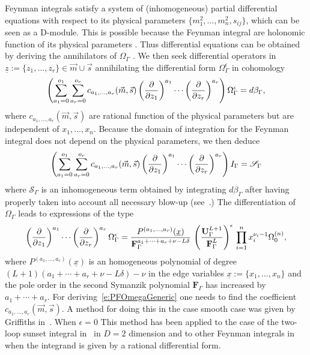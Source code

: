 \documentclass[a4paper,12pt]{article}
\newcommand\lNote[1]{
	\todo[backgroundcolor=red!20!white,fancyline,
	bordercolor=white]{ LDLC:  #1}}
\numberwithin{equation}{section}
\numberwithin{figure}{section}
\begin{document}
Feynman integrals satisfy a system of  (inhomogeneous) partial
differential equations with respect to its physical parameters
$ \{m_1^2,\dots,m_n^2,s_{ij}\}$, which can be seen as a D-module. This is possible
because the Feynman integral are holonomic function of its physical parameters \cite{Kashiwara:1977nf}.  Thus differential equations can be obtained by deriving the annihilators  of  $\Omega_\Gamma$ \lNote{$\epsilon$?}.
We then seek differential operators in $\underline
z:=\{z_1,\dots,z_r\} \in \vec m \cup \vec s$
annihilating the differential form $\Omega_\Gamma^\epsilon$ in cohomology
\begin{equation}\label{e:PFOmegaGeneric}
\left(  \sum_{a_1=0}^{o_1} \sum_{ a_r=0}^{o_r}  c_{a_1,\dots, a_r}(\vec m,\vec s) \left(\partial\over \partial z_1\right)^{a_1}\cdots\left(\partial
  \over\partial z_r\right)^{a_r}  \right)\Omega_\Gamma^\epsilon=d\beta_\Gamma,
\end{equation}
where $  c_{a_1,\dots, a_r}(\vec m,\vec s)$ are rational function of the physical
parameters but are independent of $x_1,\dots,x_n$.  
Because the domain of integration for the Feynman integral does not
depend on the physical parameters, we then deduce
\begin{equation}\label{e:PDEintFeynman}
  \left( \sum_{a_1=0}^{o_1} \sum_{ a_r=0}^{o_r}  c_{a_1,\dots, a_r}(\vec m,\vec s) \left(\partial\over \partial z_1\right)^{a_1}\cdots\left(\partial
  \over\partial z_r\right)^{a_r}  \right)I_\Gamma=\mathscr{S}_\Gamma
\end{equation}
where $\mathscr{S}_\Gamma$ is an inhomogeneous term obtained by
integrating $d\beta_\Gamma$ after having properly taken into account
all necessary blow-up (see~\cite{bek,Brown:2009ta,Bloch:2016izu,muller2014picard}.) The    differentiation of $\Omega_\Gamma$ 
leads  to  expressions of the type \lNote{notation for $a_1+\dots+a_r$}
\begin{equation}\label{e:PDE}
\left(\partial\over \partial z_1\right)^{a_1}\cdots\left(\partial
  \over\partial z_r\right)^{a_r} \Omega_\Gamma^\epsilon=
{  P^{(a_1,\dots,a_r)}(\underline x)\over \textbf{F}_\Gamma^{a_1+\cdots +a_r+\nu-L\delta}}\,
  \left(\textbf{U}_\Gamma^{L+1}\over \textbf{F}_\Gamma^L\right)^{\epsilon} \, \prod_{i=1}^n x_i^{\nu_i-1} \Omega^{(n)}_0  ,
\end{equation}
where $  P^{(a_1,\dots,a_r)}(\underline x)$ is an
  homogeneous polynomial of degree $(L+1)(a_1+\cdots+a_r+\nu-L\delta)-\nu$ in
 the edge variables $\underline x:=\{x_1,\dots, x_n\}$ and the
  pole order in the second Symanzik polynomial $\textbf{F}_\Gamma$ has increased by
  $a_1+\cdots+a_r$.
  For deriving~\eqref{e:PFOmegaGeneric} one needs to find the
  coefficient $c_{a_1,\dots,a_r}(\vec m,\vec s)$.  A method for doing this in the
  case smooth case was given by Griffiths in~\cite{Griffiths_1969,Dwork_1962,Dwork_1964}.
When $\epsilon=0$ 
This method has been applied to the case of the two-loop sunset
integral in~\cite{Bloch:2016izu} in $D=2$ dimension and to other Feynman
integrals in~\cite{Lairez:2022zkj}  when the integrand is given by a rational
differential form.
  
\end{document}
